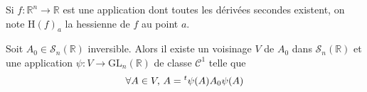 




	\begin{notation}
		Si $f : \mathbb{R}^n \rightarrow \mathbb{R}$ est une application dont toutes les dérivées secondes existent, on note $\mathrm{H}(f)_a$ la hessienne de $f$ au point $a$.
	\end{notation}


	\begin{lemma}
		\label{lemme-de-morse-1}
		Soit $A_0 \in \mathcal{S}_n(\mathbb{R})$ inversible. Alors il existe un voisinage $V$ de $A_0$ dans $\mathcal{S}_n(\mathbb{R})$ et une application $\psi : V \rightarrow \mathrm{GL}_n(\mathbb{R})$ de classe $\mathcal{C}^1$ telle que
		\[ \forall A \in V, \, A = \mathstrut ^t \psi(A) A_0 \psi(A) \]
	\end{lemma}

